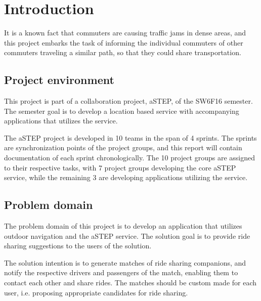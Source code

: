 \chapter{Introduction}\label{ch:introduction}


It is a known fact that commuters are causing traffic jams in dense areas, and this project embarks the task of informing the individual commuters of other commuters traveling a similar path, so that they could share transportation. 


\section{Project environment}
This project is part of a collaboration project, aSTEP, of the SW6F16 semester. The semester goal is to develop a location based service with accompanying applications that utilizes the service. 

The aSTEP project is developed in 10 teams in the span of 4 sprints. The sprints are synchronization points of the project groups, and this report will contain documentation of each sprint chronologically. The 10 project groups are assigned to their respective tasks, with 7 project groups developing the core aSTEP service, while the remaining 3 are developing applications utilizing the service.


\section{Problem domain}
The problem domain of this project is to develop an application that utilizes outdoor navigation and the aSTEP service. The solution goal is to provide ride sharing suggestions to the users of the solution. 

The solution intention is to generate matches of ride sharing companions, and notify the respective drivers and passengers of the match, enabling them to contact each other and share rides. The matches should be custom made for each user, i.e. proposing appropriate  candidates for ride sharing.

